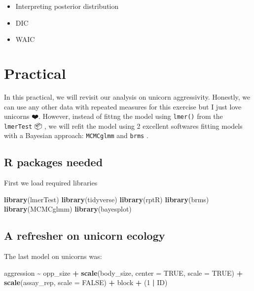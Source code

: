 \documentclass[
  12pt,
]{book}
\newenvironment{Shaded}{\begin{snugshade}}{\end{snugshade}}
\newcommand{\DataTypeTok}[1]{\textcolor[rgb]{0.13,0.29,0.53}{#1}}
\newcommand{\DecValTok}[1]{\textcolor[rgb]{0.00,0.00,0.81}{#1}}
\newcommand{\KeywordTok}[1]{\textcolor[rgb]{0.13,0.29,0.53}{\textbf{#1}}}
\newcommand{\NormalTok}[1]{#1}
\newcommand{\OperatorTok}[1]{\textcolor[rgb]{0.81,0.36,0.00}{\textbf{#1}}}
\newcommand{\OtherTok}[1]{\textcolor[rgb]{0.56,0.35,0.01}{#1}}
\newcommand{\StringTok}[1]{\textcolor[rgb]{0.31,0.60,0.02}{#1}}
\providecommand{\tightlist}{%
  \setlength{\itemsep}{0pt}\setlength{\parskip}{0pt}}
\begin{document}
\begin{itemize}
\tightlist
\item
  Interpreting posterior distribution
\item
  DIC
\item
  WAIC
\end{itemize}

\hypertarget{practical-5}{%
\section{Practical}\label{practical-5}}

In this practical, we will revisit our analysis on unicorn aggressivity.
Honestly, we can use any other data with repeated measures for this exercise
but I just love unicorns ❤️.
However, instead of fittng the model using \texttt{lmer()} from the \texttt{lmerTest}
📦 \citep{R-lmerTest}, we will refit the model using 2 excellent
softwares fitting models with a Bayesian approach: \texttt{MCMCglmm} \citep{MCMCglmm2010} and
\texttt{brms} \citep{R-brms}.

\hypertarget{r-packages-needed-1}{%
\subsection{R packages needed}\label{r-packages-needed-1}}

First we load required libraries

\begin{Shaded}
\begin{Highlighting}[]
\KeywordTok{library}\NormalTok{(lmerTest)}
\KeywordTok{library}\NormalTok{(tidyverse)}
\KeywordTok{library}\NormalTok{(rptR)}
\KeywordTok{library}\NormalTok{(brms)}
\KeywordTok{library}\NormalTok{(MCMCglmm)}
\KeywordTok{library}\NormalTok{(bayesplot)}
\end{Highlighting}
\end{Shaded}

\hypertarget{a-refresher-on-unicorn-ecology}{%
\subsection{A refresher on unicorn ecology}\label{a-refresher-on-unicorn-ecology}}

The last model on unicorns was:

\begin{Shaded}
\begin{Highlighting}[]
\NormalTok{aggression }\OperatorTok{\textasciitilde{}}\StringTok{ }\NormalTok{opp\_size }\OperatorTok{+}\StringTok{ }\KeywordTok{scale}\NormalTok{(body\_size, }\DataTypeTok{center =} \OtherTok{TRUE}\NormalTok{, }\DataTypeTok{scale =} \OtherTok{TRUE}\NormalTok{)}
              \OperatorTok{+}\StringTok{ }\KeywordTok{scale}\NormalTok{(assay\_rep, }\DataTypeTok{scale =} \OtherTok{FALSE}\NormalTok{) }\OperatorTok{+}\StringTok{ }\NormalTok{block}
              \OperatorTok{+}\StringTok{ }\NormalTok{(}\DecValTok{1} \OperatorTok{|}\StringTok{ }\NormalTok{ID)}
\end{Highlighting}
\end{Shaded}
\end{document}

